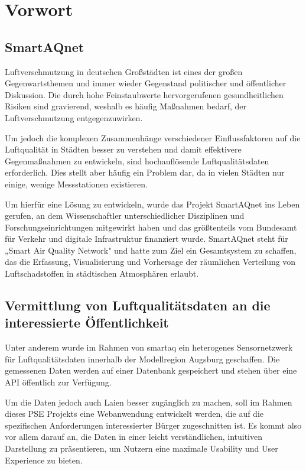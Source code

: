 \section{Vorwort}

\subsection{SmartAQnet}
Luftverschmutzung in deutschen Großstädten ist eines der großen Gegenwartsthemen und immer wieder Gegenstand politischer und öffentlicher Diskussion. Die durch hohe Feinstaubwerte hervorgerufenen gesundheitlichen Risiken sind gravierend, weshalb es häufig Maßnahmen bedarf, der Luftverschmutzung entgegenzuwirken.

Um jedoch die komplexen Zusammenhänge verschiedener Einflussfaktoren auf die Luftqualität in Städten besser zu verstehen und damit effektivere Gegenmaßnahmen zu entwickeln, sind hochauflösende Luftqualitätsdaten erforderlich. Dies stellt aber häufig ein Problem dar, da in vielen Städten nur einige, wenige Messstationen existieren.

Um hierfür eine Lösung zu entwickeln, wurde das Projekt SmartAQnet ins Leben gerufen, an dem Wissenschaftler unterschiedlicher Disziplinen und Forschungseinrichtungen mitgewirkt haben und das größtenteils vom Bundesamt für Verkehr und digitale Infrastruktur finanziert wurde. SmartAQnet steht für „Smart Air Quality Network" und hatte zum Ziel ein Gesamtsystem zu schaffen, das die Erfassung, Visualisierung und Vorhersage der räumlichen Verteilung von Luftschadstoffen in städtischen Atmosphären erlaubt.

\subsection{Vermittlung von Luftqualitätsdaten an die interessierte Öffentlichkeit}

Unter anderem wurde im Rahmen von \gls{smartaq} ein heterogenes Sensornetzwerk für Luftqualitätsdaten innerhalb der Modellregion Augsburg geschaffen. Die gemessenen Daten werden auf einer Datenbank gespeichert und stehen über eine API öffentlich zur Verfügung.

Um die Daten jedoch auch Laien besser zugänglich zu machen, soll im Rahmen dieses PSE Projekts eine \gls{Webanwendung} entwickelt werden, die auf die spezifischen Anforderungen interessierter Bürger zugeschnitten ist. Es kommt also vor allem darauf an, die Daten in einer leicht verständlichen, intuitiven Darstellung zu präsentieren, um Nutzern eine maximale Usability und User Experience zu bieten.